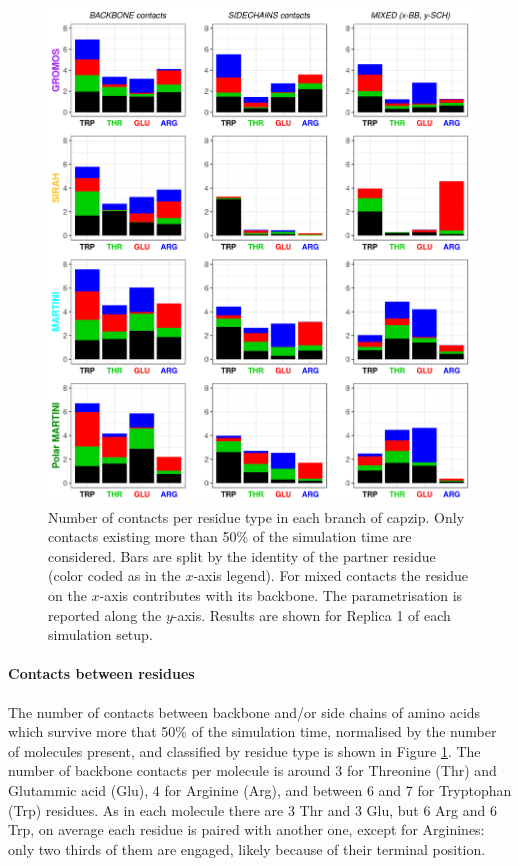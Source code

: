 \begin{figure}[p]
\centering
\includegraphics[width=0.95\linewidth]{3results_capsule/pics/new_rep1_allFF.png}
\caption[Contacts between molecules during simulations of the buckyball]{Number of contacts per residue type in each branch of capzip. Only contacts existing more than 50\% of the simulation time are considered. Bars are split by the identity of the partner residue (color coded as in the $x$-axis legend). For mixed contacts the residue on the $x$-axis contributes with its backbone. The parametrisation is reported along the $y$-axis. Results are shown for Replica 1 of each simulation setup.}
\label{fig:BTI_cont}
\end{figure}

\paragraph{Contacts between residues} The number of contacts between backbone and/or side chains of amino acids which survive more that 50\% of the simulation time, normalised by the number of molecules present, and classified by residue type is shown in Figure \ref{fig:BTI_cont}. 
%
The number of backbone contacts per molecule is around 3 for Threonine (Thr) and Glutammic acid (Glu), 4 for Arginine (Arg), and between 6 and 7 for Tryptophan (Trp) residues.
%
As in each molecule there are 3 Thr and 3 Glu, but 6 Arg and 6 Trp, on average each residue is paired with another one, except for Arginines: only two thirds of them are engaged, likely because of their terminal position.

